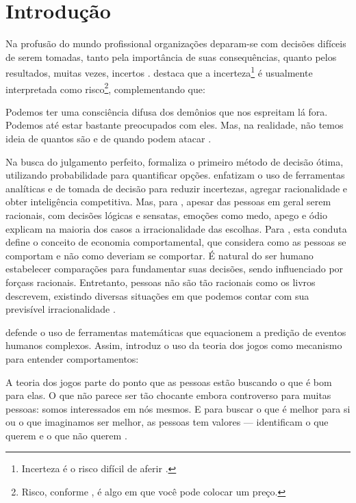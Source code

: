 \documentclass[
	article,			        %
	11pt,				          %
	oneside,			        %
	a4paper,			        %
	english,			        %
	brazil,				        %
	sumario=tradicional
]{abntex2}\usepackage[]{graphicx}\usepackage[]{color}
\begin{document}
\section*{Introdução}

Na profusão do mundo profissional organizações deparam-se com decisões difíceis de serem tomadas, tanto pela import\^ancia de suas consequências, quanto pelos resultados, muitas vezes, incertos \cite{Bekman.2009}.  destaca que a incerteza\footnote{Incerteza é o risco difícil de aferir \cite{Nate.2012}.} é usualmente interpretada como risco\footnote{Risco, conforme , é algo em que você pode colocar um preço.}, complementando que:

\begin{citacao}
  Podemos ter uma consciência difusa dos demônios que nos espreitam lá fora. Podemos até estar bastante preocupados com eles. Mas, na realidade, não temos ideia de quantos são e de quando podem atacar \cite{Nate.2012}.
\end{citacao}

Na busca do julgamento perfeito,  formaliza o primeiro método de decisão ótima, utilizando probabilidade para quantificar opções.  enfatizam o uso de ferramentas analíticas e de tomada de decisão para reduzir incertezas, agregar racionalidade e obter inteligência competitiva. Mas, para , apesar das pessoas em geral serem racionais, com decisões lógicas e sensatas, emoções como medo, apego e ódio explicam na maioria dos casos a irracionalidade das escolhas. Para , esta conduta define o conceito de economia comportamental, que considera como as pessoas se comportam e não como deveriam se comportar. É natural do ser humano estabelecer comparações para fundamentar suas decisões, sendo influenciado por forçass racionais. Entretanto, pessoas não são tão racionais como os livros descrevem, existindo diversas situações em que podemos contar com sua previsível irracionalidade \cite{Ariely.2012}. 

 defende o uso de ferramentas matemáticas que equacionem a predição de eventos humanos complexos. Assim, introduz o uso da teoria dos jogos como mecanismo para entender comportamentos:

\begin{citacao}
  A teoria dos jogos parte do ponto que as pessoas estão buscando o que é bom para elas. O que não parece ser tão chocante embora controverso para muitas pessoas: somos interessados em nós mesmos. E para buscar o que é melhor para si ou o que imaginamos ser melhor, as pessoas tem valores --- identificam o que querem e o que não querem \cite{MesquitaTED.2009}. 
\end{citacao}
\end{document}
